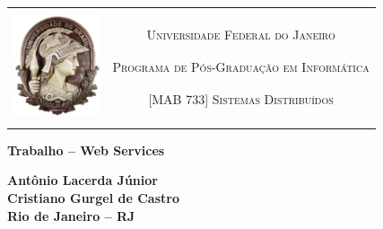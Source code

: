 \begin{titlepage}
\begin{center}

\begin{table}[h]
\centering
\setlength{\arrayrulewidth}{3.5\arrayrulewidth}
    \begin{tabular}{cc}
    \hline\\
    \multirow{5}{*}{\includegraphics[height=3cm]{imgs/ufrj}}&\\
    & \textsc{Universidade Federal do Janeiro}\\
    & \textsc{Programa de Pós-Graduação em Informática}\\
    & \textsc{[MAB 733] Sistemas Distribuídos}\\
    &\\
    &\\
    \hline
    \end{tabular}
\end{table}


\vfill

\LARGE
\textbf{Trabalho -- Web Services}

\vfill

\normalsize
\textbf{Antônio Lacerda Júnior}\\
\textbf{Cristiano Gurgel de Castro}\\

\vfill
\textbf{Rio de Janeiro -- RJ}

\end{center}
\end{titlepage}
